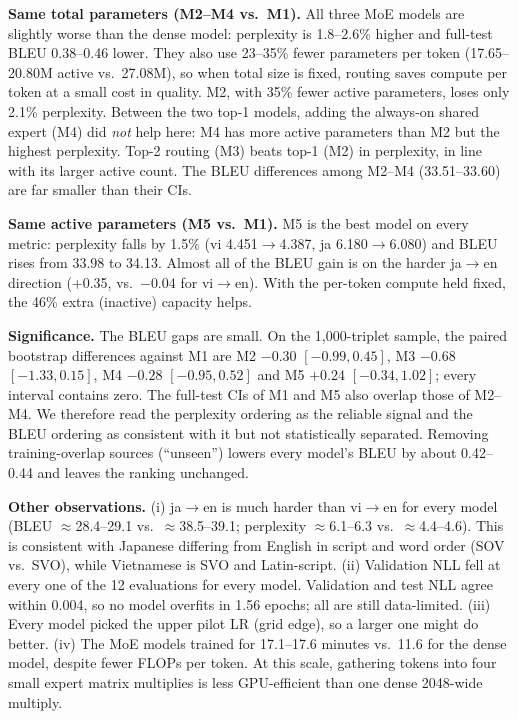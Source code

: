 \documentclass[11pt,a4paper]{article}
\begin{document}
\textbf{Same total parameters (M2--M4 vs.\ M1).} All three MoE models are slightly worse than the dense model: perplexity is 1.8--2.6\% higher and full-test BLEU 0.38--0.46 lower. They also use 23--35\% fewer parameters per token (17.65--20.80M active vs.\ 27.08M), so when total size is fixed, routing saves compute per token at a small cost in quality. M2, with 35\% fewer active parameters, loses only 2.1\% perplexity. Between the two top-1 models, adding the always-on shared expert (M4) did \emph{not} help here: M4 has more active parameters than M2 but the highest perplexity. Top-2 routing (M3) beats top-1 (M2) in perplexity, in line with its larger active count. The BLEU differences among M2--M4 (33.51--33.60) are far smaller than their CIs.

\textbf{Same active parameters (M5 vs.\ M1).} M5 is the best model on every metric: perplexity falls by 1.5\% (vi 4.451$\to$4.387, ja 6.180$\to$6.080) and BLEU rises from 33.98 to 34.13. Almost all of the BLEU gain is on the harder ja$\to$en direction (+0.35, vs.\ $-0.04$ for vi$\to$en). With the per-token compute held fixed, the 46\% extra (inactive) capacity helps.

\textbf{Significance.} The BLEU gaps are small. On the 1,000-triplet sample, the paired bootstrap differences against M1 are M2 $-0.30$ $[-0.99, 0.45]$, M3 $-0.68$ $[-1.33, 0.15]$, M4 $-0.28$ $[-0.95, 0.52]$ and M5 $+0.24$ $[-0.34, 1.02]$; every interval contains zero. The full-test CIs of M1 and M5 also overlap those of M2--M4. We therefore read the perplexity ordering as the reliable signal and the BLEU ordering as consistent with it but not statistically separated. Removing training-overlap sources (``unseen'') lowers every model's BLEU by about 0.42--0.44 and leaves the ranking unchanged.

\textbf{Other observations.} (i) ja$\to$en is much harder than vi$\to$en for every model (BLEU $\approx$28.4--29.1 vs.\ $\approx$38.5--39.1; perplexity $\approx$6.1--6.3 vs.\ $\approx$4.4--4.6). This is consistent with Japanese differing from English in script and word order (SOV vs.\ SVO), while Vietnamese is SVO and Latin-script. (ii) Validation NLL fell at every one of the 12 evaluations for every model. Validation and test NLL agree within 0.004, so no model overfits in 1.56 epochs; all are still data-limited. (iii) Every model picked the upper pilot LR (grid edge), so a larger one might do better. (iv) The MoE models trained for 17.1--17.6 minutes vs.\ 11.6 for the dense model, despite fewer FLOPs per token. At this scale, gathering tokens into four small expert matrix multiplies is less GPU-efficient than one dense 2048-wide multiply.
\end{document}
